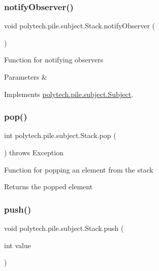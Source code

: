 \subsubsection{\texorpdfstring{notify\+Observer()}{notifyObserver()}}
{\footnotesize\ttfamily void polytech.\+pile.\+subject.\+Stack.\+notify\+Observer (\begin{DoxyParamCaption}{ }\end{DoxyParamCaption})}

Function for notifying observers


\begin{DoxyParams}{Parameters}
{\em } & \\
\hline
\end{DoxyParams}


Implements \hyperlink{interfacepolytech_1_1pile_1_1subject_1_1_subject_a4ae5fcf71f744b2f086d172e5922bc0d}{polytech.\+pile.\+subject.\+Subject}.

\hypertarget{classpolytech_1_1pile_1_1subject_1_1_stack_a88c36e3ec222b68a6e54739eb4e81f0e}{}\label{classpolytech_1_1pile_1_1subject_1_1_stack_a88c36e3ec222b68a6e54739eb4e81f0e} 
\subsubsection{\texorpdfstring{pop()}{pop()}}
{\footnotesize\ttfamily int polytech.\+pile.\+subject.\+Stack.\+pop (\begin{DoxyParamCaption}{ }\end{DoxyParamCaption}) throws Exception}

Function for popping an element from the stack

\begin{DoxyReturn}{Returns}
the popped element 
\end{DoxyReturn}
\hypertarget{classpolytech_1_1pile_1_1subject_1_1_stack_adb4397a6a951ba4fcfb3040706773a86}{}\label{classpolytech_1_1pile_1_1subject_1_1_stack_adb4397a6a951ba4fcfb3040706773a86} 
\subsubsection{\texorpdfstring{push()}{push()}}
{\footnotesize\ttfamily void polytech.\+pile.\+subject.\+Stack.\+push (\begin{DoxyParamCaption}\item[{int}]{value }\end{DoxyParamCaption})}

